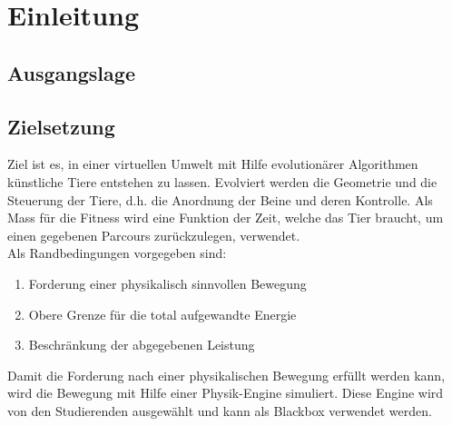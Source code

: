 %
%


\chapter{Einleitung}
  \lipsum[33-35]

\section{Ausgangslage}

\section{Zielsetzung}
  Ziel ist es, in einer virtuellen Umwelt mit Hilfe evolutionärer Algorithmen künstliche Tiere entstehen zu lassen.
  Evolviert werden die Geometrie und die Steuerung der Tiere, d.h. die Anordnung der Beine und deren Kontrolle.
  Als Mass für die Fitness wird eine Funktion der Zeit, welche das Tier braucht,
  um einen gegebenen Parcours zurückzulegen, verwendet.\\
  Als Randbedingungen vorgegeben sind:
  \begin{enumerate}
    \item Forderung einer physikalisch sinnvollen Bewegung
    \item Obere Grenze für die total aufgewandte Energie
    \item Beschränkung der abgegebenen Leistung
  \end{enumerate}
  Damit die Forderung nach einer physikalischen Bewegung erfüllt werden kann,
  wird die Bewegung mit Hilfe einer Physik-Engine simuliert.
  Diese Engine wird von den Studierenden ausgewählt und kann als Blackbox verwendet werden.
